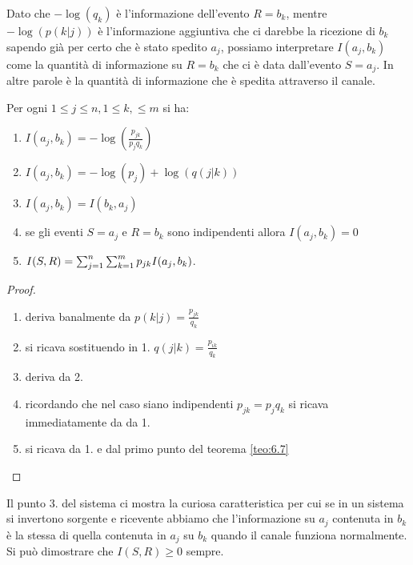 Dato che $- \log(q_k)$ è l'informazione dell'evento $R=b_k$, mentre $- \log(p(k|j))$ è l'informazione aggiuntiva che ci darebbe la ricezione di $b_k$ sapendo già per certo che è stato spedito $a_j$, possiamo interpretare $I(a_j,b_k)$ come la quantità di informazione su $R=b_k$ che ci è data dall'evento $S=a_j$. In altre parole è la quantità di informazione che è spedita attraverso il canale.
\begin{teo} \label{teo:7.1}
Per ogni $1\leq j \leq n , 1 \leq k, \leq m$ si ha:
\begin{enumerate}
\item $I(a_j,b_k)=- \log(\frac{p_{jk}}{p_j q_k})$
\item $I(a_j,b_k)=- \log(p_j)+ \log(q(j|k))$
\item $I(a_j,b_k)=I(b_k,a_j)$
\item se gli eventi $S=a_j$ e $R=b_k$ sono indipendenti allora $I(a_j,b_k)=0$
\item $I(S,R)=\sum_{j=1}^n \sum_{k=1}^m p_{jk}I(a_j,b_k)$.
\end{enumerate}
\end{teo}
\begin{proof}
\begin{enumerate}
\item deriva banalmente da $p(k|j)=\frac{p_{jk}}{q_k}$
\item si ricava sostituendo in 1. $q(j|k)=\frac{p_{ik}}{q_k}$
\item deriva da 2.
\item ricordando che nel caso siano indipendenti $p_{jk}=p_jq_k$ si ricava immediatamente da da 1.
\item si ricava da 1. e dal primo punto del teorema \ref{teo:6.7}
\end{enumerate}
\end{proof}
Il punto 3. del sistema ci mostra la curiosa caratteristica per cui se in un sistema si invertono sorgente e ricevente abbiamo che l'informazione su $a_j$ contenuta in $b_k$ è la stessa di quella contenuta in $a_j$ su $b_k$ quando il canale funziona normalmente. Si può dimostrare che $I(S,R)\geq 0$ sempre.


